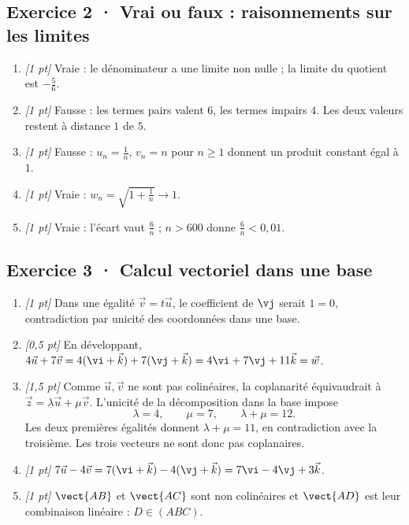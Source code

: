\subsection*{Exercice 2 · Vrai ou faux : raisonnements sur les limites}\begin{enumerate}

\item \textit{[1 pt]} Vraie : le dénominateur a une limite non nulle ; la limite du quotient est $-\frac{5}{6}$.

\item \textit{[1 pt]} Fausse : les termes pairs valent $6$, les termes impairs $4$. Les deux valeurs restent à distance $1$ de $5$.

\item \textit{[1 pt]} Fausse : $u_n=\frac{1}{n}$, $v_n=n$ pour $n\ge1$ donnent un produit constant égal à $1$.

\item \textit{[1 pt]} Vraie : $w_n=\sqrt{1+\frac{1}{n}}\to1$.

\item \textit{[1 pt]} Vraie : l'écart vaut $\frac{6}{n}$ ; $n>600$ donne $\frac{6}{n}<0{,}01$.

\end{enumerate}

\subsection*{Exercice 3 · Calcul vectoriel dans une base}\begin{enumerate}

\item \textit{[1 pt]} Dans une égalité $\vec v=t\vec u$, le coefficient de $\vj $ serait $1=0$, contradiction par unicité des coordonnées dans une base.

\item \textit{[0,5 pt]} En développant, $4\vec u+7\vec v=4(\vi +\vec k)+7(\vj +\vec k)=4\vi +7\vj +11\vec k=\vec w$.

\item \textit{[1,5 pt]} Comme $\vec u,\vec v$ ne sont pas colinéaires, la coplanarité équivaudrait à $\vec z=\lambda\vec u+\mu\vec v$. L'unicité de la décomposition dans la base impose
\[\lambda=4,\qquad\mu=7,\qquad\lambda+\mu=12.\]
Les deux premières égalités donnent $\lambda+\mu=11$, en contradiction avec la troisième. Les trois vecteurs ne sont donc pas coplanaires.

\item \textit{[1 pt]} $7\vec u-4\vec v=7(\vi +\vec k)-4(\vj +\vec k)=7\vi -4\vj +3\vec k$.

\item \textit{[1 pt]} $\vect{AB}$ et $\vect{AC}$ sont non colinéaires et $\vect{AD}$ est leur combinaison linéaire : $D\in(ABC)$.

\end{enumerate}


